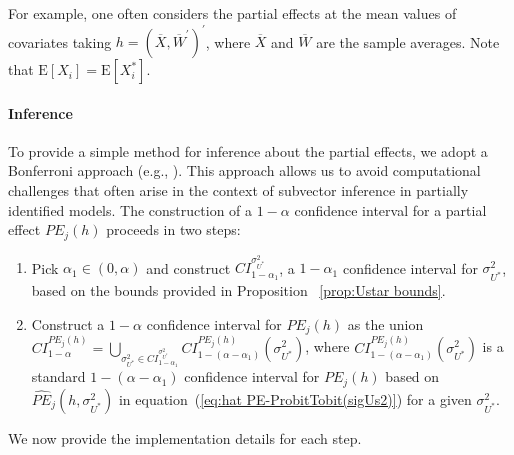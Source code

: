 \documentclass[12pt]{article}
\begin{document}
For example, one often considers the partial effects at the mean values of
covariates taking $h=(\overline{X},\overline{W}^{\prime })^{\prime }$, where 
$\overline{X}$ and $\overline{W}$ are the sample averages.  Note
that $\mathrm{E}\left[ X_{i}\right] =\mathrm{E}\left[ X_{i}^{\ast }\right] $.

\paragraph{Inference}

To provide a simple method for inference about the partial effects, we adopt
a Bonferroni approach (e.g., \citealp{McCloskey2017JoE}). This approach
allows us to avoid computational challenges that often arise in the context
of subvector inference in partially identified models. The construction of a 
$1-\alpha $ confidence interval for a partial effect $PE_{j}(h)$ proceeds in
two steps:

\begin{enumerate}
\item Pick $\alpha _{1}\in (0,\alpha )$ and construct $CI_{1-\alpha
_{1}}^{\sigma _{U^{\ast }}^{2}}$, a $1-\alpha _{1}$ confidence interval for $%
\sigma _{U^{\ast }}^{2}$, based on the bounds provided in Proposition~%
\ref{prop:Ustar bounds}.

\item Construct a $1-\alpha $ confidence interval for $PE_{j}(h)$ as the
union $CI_{1-\alpha }^{PE_{j}(h)}=\bigcup_{\sigma _{U^{\ast }}^{2}\in
CI_{1-\alpha _{1}}^{\sigma _{U^{\ast }}^{2}}}CI_{1-\left( \alpha -\alpha
_{1}\right) }^{PE_{j}(h)}\left( \sigma _{U^{\ast }}^{2}\right) $, where $%
CI_{1-\left( \alpha -\alpha _{1}\right) }^{PE_{j}(h)}\left( \sigma _{U^{\ast
}}^{2}\right) $ is a standard $1-(\alpha -\alpha _{1})$ confidence interval
for $PE_{j}(h)$ based on $\widehat{PE}_{{j}}\left( h,\sigma _{U^{\ast
}}^{2}\right) $ in equation~(\ref{eq:hat PE-ProbitTobit(sigUs2)}) for a
given $\sigma _{U^{\ast }}^{2}$.
\end{enumerate}

We now provide the implementation details for each step.

\smallskip
\end{document}
